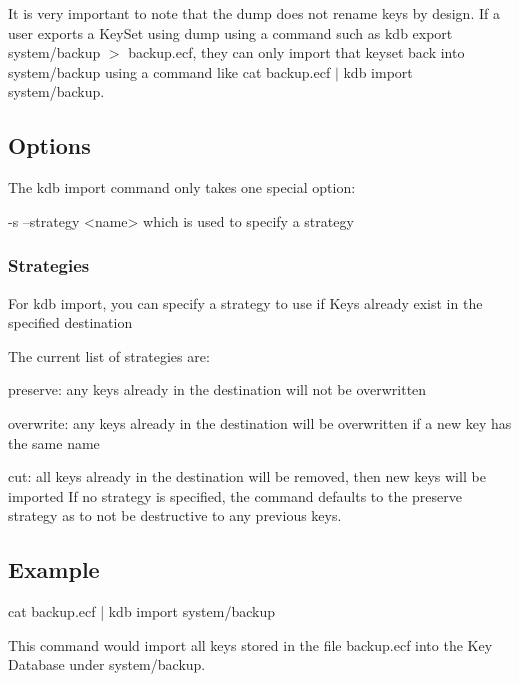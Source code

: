 It is very important to note that the dump does not rename keys by design. If a user exports a Key\+Set using dump using a command such as {\ttfamily kdb export system/backup $>$ backup.\+ecf}, they can only import that keyset back into system/backup using a command like {\ttfamily cat backup.\+ecf $\vert$ kdb import system/backup}.

\subsection*{Options}

The kdb import command only takes one special option\+: \begin{DoxyVerb}    -s --strategy <name>            which is used to specify a strategy
\end{DoxyVerb}


\subsubsection*{Strategies}

For kdb import, you can specify a strategy to use if Keys already exist in the specified destination

The current list of strategies are\+:


\begin{DoxyItemize}
\item {\ttfamily preserve}\+: any keys already in the destination will not be overwritten
\item {\ttfamily overwrite}\+: any keys already in the destination will be overwritten if a new key has the same name
\item {\ttfamily cut}\+: all keys already in the destination will be removed, then new keys will be imported If no strategy is specified, the command defaults to the preserve strategy as to not be destructive to any previous keys.
\end{DoxyItemize}

\subsection*{Example}

\begin{DoxyVerb}    cat backup.ecf | kdb import system/backup
\end{DoxyVerb}


This command would import all keys stored in the file backup.\+ecf into the Key Database under system/backup.

